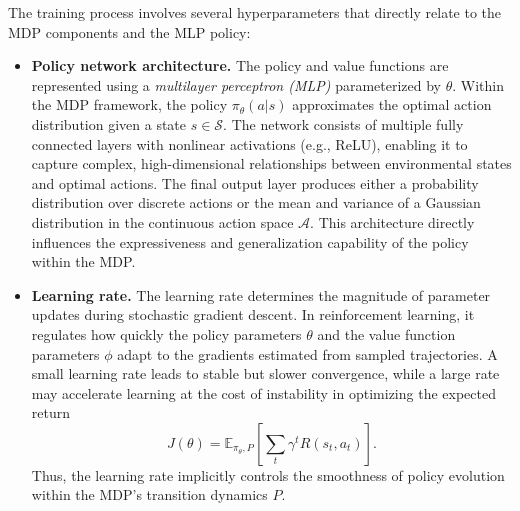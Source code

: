 \documentclass[english, 12pt, a4paper, elec, utf8, a-2b, online]{aaltothesis}
\begin{document}
The training process involves several hyperparameters that directly relate to the MDP components and the MLP policy:
\begin{itemize}
    \item \textbf{Policy network architecture.}  
    The policy and value functions are represented using a \textit{multilayer perceptron (MLP)} parameterized by $\theta$. Within the MDP framework, the policy $\pi_\theta(a|s)$ approximates the optimal action distribution given a state $s \in \mathcal{S}$. The network consists of multiple fully connected layers with nonlinear activations (e.g., ReLU), enabling it to capture complex, high-dimensional relationships between environmental states and optimal actions. The final output layer produces either a probability distribution over discrete actions or the mean and variance of a Gaussian distribution in the continuous action space $\mathcal{A}$. This architecture directly influences the expressiveness and generalization capability of the policy within the MDP.
    
    \item \textbf{Learning rate.}  
    The learning rate determines the magnitude of parameter updates during stochastic gradient descent. In reinforcement learning, it regulates how quickly the policy parameters $\theta$ and the value function parameters $\phi$ adapt to the gradients estimated from sampled trajectories. A small learning rate leads to stable but slower convergence, while a large rate may accelerate learning at the cost of instability in optimizing the expected return
    \begin{equation}
    J(\theta) = \mathbb{E}_{\pi_\theta, P}\!\left[\sum_t \gamma^t R(s_t, a_t)\right].
    \end{equation}
    Thus, the learning rate implicitly controls the smoothness of policy evolution within the MDP’s transition dynamics $P$.
    

\end{itemize}
\end{document}
